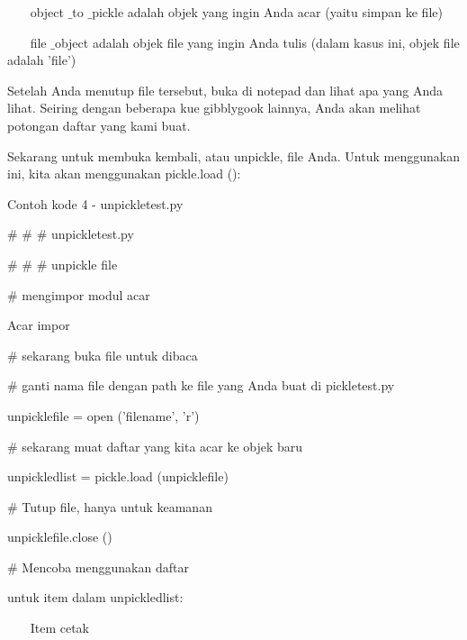 \vspace{12pt}
\noindent 
~~~ object $  \_  $to $  \_  $pickle adalah objek yang ingin Anda acar (yaitu simpan ke file) \par
\noindent 
~~~ file $  \_  $object adalah objek file yang ingin Anda tulis (dalam kasus ini, objek file adalah 'file') \par
\vspace{12pt}
\noindent 
Setelah Anda menutup file tersebut, buka di notepad dan lihat apa yang Anda lihat. Seiring dengan beberapa kue gibblygook lainnya, Anda akan melihat potongan daftar yang kami buat. \par
\vspace{12pt}
\noindent 
Sekarang untuk membuka kembali, atau unpickle, file Anda. Untuk menggunakan ini, kita akan menggunakan pickle.load (): \par
Contoh kode 4 - unpickletest.py \par
\vspace{12pt}
\noindent 
 $  \#  $ $  \#  $ $  \#  $ unpickletest.py \par
\noindent 
 $  \#  $ $  \#  $ $  \#  $ unpickle file \par
\vspace{12pt}
\noindent 
 $  \#  $ mengimpor modul acar \par
\noindent 
Acar impor \par
\vspace{12pt}
\noindent 
 $  \#  $ sekarang buka file untuk dibaca \par
\noindent 
 $  \#  $ ganti nama file dengan path ke file yang Anda buat di pickletest.py \par
\noindent 
unpicklefile = open ('filename', 'r') \par
\vspace{12pt}
\noindent 
 $  \#  $ sekarang muat daftar yang kita acar ke objek baru \par
\noindent 
unpickledlist = pickle.load (unpicklefile) \par
\vspace{12pt}
\noindent 
 $  \#  $ Tutup file, hanya untuk keamanan \par
\noindent 
unpicklefile.close () \par
\vspace{12pt}
\noindent 
 $  \#  $ Mencoba menggunakan daftar \par
\noindent 
untuk item dalam unpickledlist: \par
\noindent 
~~~ Item cetak \par
\vspace{12pt}

